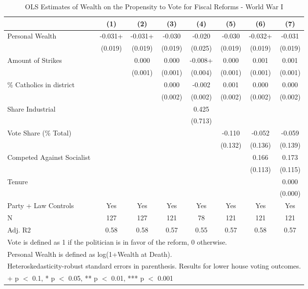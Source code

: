 \begin{table}

\caption{\label{tab:robust_firstww_ols}OLS Estimates of Wealth on the Propensity to Vote for Fiscal Reforms - World War I}
\centering
\begin{tabular}[t]{lccccccc}
\toprule
  & (1) & (2) & (3) & (4) & (5) & (6) & (7)\\
\midrule
Personal Wealth & -0.031+ & -0.031+ & -0.030 & -0.020 & -0.030 & -0.032+ & -0.031\\
 & (0.019) & (0.019) & (0.019) & (0.025) & (0.019) & (0.019) & (0.019)\\
Amount of Strikes &  & 0.000 & 0.000 & -0.008+ & 0.000 & 0.001 & 0.001\\
 &  & (0.001) & (0.001) & (0.004) & (0.001) & (0.001) & (0.001)\\
\% Catholics in district &  &  & 0.000 & -0.002 & 0.001 & 0.000 & 0.000\\
 &  &  & (0.002) & (0.002) & (0.002) & (0.002) & (0.002)\\
Share Industrial &  &  &  & 0.425 &  &  & \\
 &  &  &  & (0.713) &  &  & \\
Vote Share (\% Total) &  &  &  &  & -0.110 & -0.052 & -0.059\\
 &  &  &  &  & (0.132) & (0.136) & (0.139)\\
Competed Against Socialist &  &  &  &  &  & 0.166 & 0.173\\
 &  &  &  &  &  & (0.113) & (0.115)\\
Tenure &  &  &  &  &  &  & 0.000\\
 &  &  &  &  &  &  & (0.000)\\
\midrule
Party + Law Controls & Yes & Yes & Yes & Yes & Yes & Yes & Yes\\
N & 127 & 127 & 121 & 78 & 121 & 121 & 121\\
Adj. R2 & 0.58 & 0.58 & 0.57 & 0.55 & 0.57 & 0.58 & 0.57\\
\bottomrule
\multicolumn{8}{l}{\rule{0pt}{1em}Vote is defined as 1 if the politician is in favor of the reform, 0 otherwise.}\\
\multicolumn{8}{l}{\rule{0pt}{1em}Personal Wealth is defined as log(1+Wealth at Death).}\\
\multicolumn{8}{l}{\rule{0pt}{1em}Heteroskedasticity-robust standard errors in parenthesis. Results for lower house voting outcomes.}\\
\multicolumn{8}{l}{\rule{0pt}{1em}+ p $<$ 0.1, * p $<$ 0.05, ** p $<$ 0.01, *** p $<$ 0.001}\\
\end{tabular}
\end{table}
